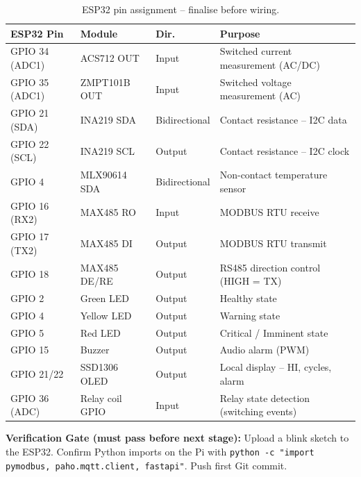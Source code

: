 \documentclass[12pt,a4paper]{article}
\newenvironment{checkgate}{%
  \begin{mdframed}[backgroundcolor=yellow!10,linecolor=orange!70,linewidth=1.5pt,
    innerleftmargin=9pt,innerrightmargin=9pt,innertopmargin=5pt,innerbottommargin=5pt]
  \textbf{\color{orange!70!black}Verification Gate (must pass before next stage): }}{\end{mdframed}}
\begin{document}
\begin{table}[H]
\centering
\small
\begin{tabularx}{\textwidth}{lllX}
\toprule
\textbf{ESP32 Pin} & \textbf{Module} & \textbf{Dir.} & \textbf{Purpose} \\
\midrule
GPIO 34 (ADC1)   & ACS712 OUT      & Input         & Switched current measurement (AC/DC) \\
GPIO 35 (ADC1)   & ZMPT101B OUT    & Input         & Switched voltage measurement (AC) \\
GPIO 21 (SDA)    & INA219 SDA      & Bidirectional & Contact resistance -- I2C data \\
GPIO 22 (SCL)    & INA219 SCL      & Output        & Contact resistance -- I2C clock \\
GPIO 4           & MLX90614 SDA    & Bidirectional & Non-contact temperature sensor \\
GPIO 16 (RX2)    & MAX485 RO       & Input         & MODBUS RTU receive \\
GPIO 17 (TX2)    & MAX485 DI       & Output        & MODBUS RTU transmit \\
GPIO 18          & MAX485 DE/RE    & Output        & RS485 direction control (HIGH = TX) \\
GPIO 2           & Green LED       & Output        & Healthy state \\
GPIO 4           & Yellow LED      & Output        & Warning state \\
GPIO 5           & Red LED         & Output        & Critical / Imminent state \\
GPIO 15          & Buzzer          & Output        & Audio alarm (PWM) \\
GPIO 21/22       & SSD1306 OLED    & Output        & Local display -- HI, cycles, alarm \\
GPIO 36 (ADC)    & Relay coil GPIO & Input         & Relay state detection (switching events) \\
\bottomrule
\end{tabularx}
\caption{ESP32 pin assignment -- finalise before wiring.}
\end{table}

\begin{checkgate}
Upload a blink sketch to the ESP32. Confirm Python imports on the Pi with
\texttt{python -c "import pymodbus, paho.mqtt.client, fastapi"}. Push first Git commit.
\end{checkgate}

\end{document}
